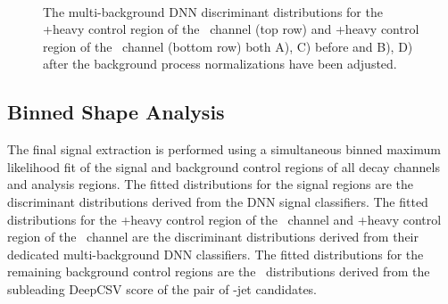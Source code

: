 \begin{figure}[htbp]
  \centering
  \mbox{
  }
  \mbox{
  }
  \caption[Multi-background DNN Discriminant Distributions]{The multi-background DNN discriminant distributions for the \bosW+heavy control region of the \WlnH\ channel (top row) and \bosZ+heavy control region of the \ZnnH\ channel (bottom row) both A), C) before and B), D) after the background process normalizations have been adjusted.}
  \label{fig:DNN_multi}
\end{figure}

\subsection{Binned Shape Analysis}

The final signal extraction is performed using a simultaneous binned maximum likelihood fit of the signal and background control regions of all decay channels and analysis regions. The fitted distributions for the signal regions are the discriminant distributions derived from the DNN signal classifiers. The fitted distributions for the \bosW+heavy control region of the \WlnH\ channel and \bosZ+heavy control region of the \ZnnH\ channel are the discriminant distributions derived from their dedicated multi-background DNN classifiers. The fitted distributions for the remaining background control regions are the \btagmin\ distributions derived from the subleading DeepCSV score of the pair of \qrkb-jet candidates.

